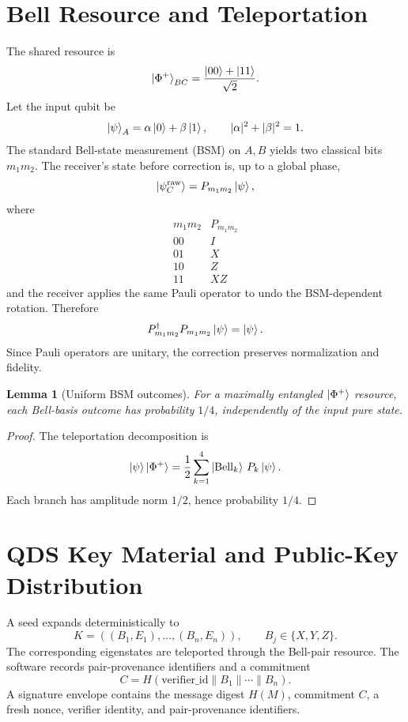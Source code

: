 \documentclass[11pt,a4paper]{article}
\newtheorem{lemma}{Lemma}
\begin{document}
\section{Bell Resource and Teleportation}
The shared resource is
\[
\ket{\Phi^+}_{BC}=\frac{\ket{00}+\ket{11}}{\sqrt2}.
\]
Let the input qubit be
\[
\ket{\psi}_A=\alpha\ket0+\beta\ket1,\qquad
|\alpha|^2+|\beta|^2=1.
\]
The standard Bell-state measurement (BSM) on $A,B$ yields two classical bits
$m_1m_2$. The receiver's state before correction is, up to a global phase,
\begin{equation}
\ket{\psi_C^{\rm raw}}=P_{m_1m_2}\ket\psi,
\end{equation}
where
\[
\begin{array}{c|c}
 m_1m_2 & P_{m_1m_2} \\ \hline
 00 & I\\
 01 & X\\
 10 & Z\\
 11 & XZ
\end{array}
\]
and the receiver applies the same Pauli operator to undo the BSM-dependent
rotation. Therefore
\begin{equation}
P_{m_1m_2}^\dagger P_{m_1m_2}\ket\psi=\ket\psi.
\end{equation}
Since Pauli operators are unitary, the correction preserves normalization and
fidelity.

\begin{lemma}[Uniform BSM outcomes]
For a maximally entangled $\ket{\Phi^+}$ resource, each Bell-basis outcome has
probability $1/4$, independently of the input pure state.
\end{lemma}
\begin{proof}
The teleportation decomposition is
\[
\ket\psi\ket{\Phi^+}
=\frac12\sum_{k=1}^4 \ket{\mathrm{Bell}_k}\,P_k\ket\psi.
\]
Each branch has amplitude norm $1/2$, hence probability $1/4$.
\end{proof}

\section{QDS Key Material and Public-Key Distribution}
A seed expands deterministically to
\[
K=((B_1,E_1),\ldots,(B_n,E_n)),
\qquad B_j\in\{X,Y,Z\}.
\]
The corresponding eigenstates are teleported through the Bell-pair resource.
The software records pair-provenance identifiers and a commitment
\[
C=H(\mathrm{verifier\_id}\parallel B_1\parallel\cdots\parallel B_n).
\]
A signature envelope contains the message digest $H(M)$, commitment $C$, a
fresh nonce, verifier identity, and pair-provenance identifiers.
\end{document}
